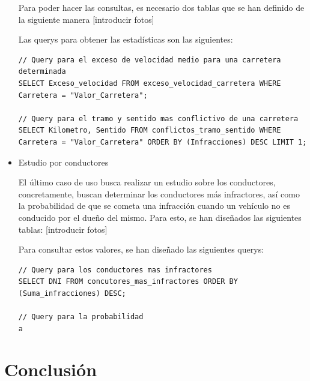 \documentclass[]{article}
\begin{document}
\begin{itemize}
    Para poder hacer las consultas, es necesario dos tablas que se han definido de la siguiente manera [introducir fotos]

    Las querys para obtener las estadísticas son las siguientes:

    \begin{lstlisting}[language=cql, caption=Querys para el caso de uso 2]
// Query para el exceso de velocidad medio para una carretera determinada
SELECT Exceso_velocidad FROM exceso_velocidad_carretera WHERE Carretera = "Valor_Carretera";

// Query para el tramo y sentido mas conflictivo de una carretera
SELECT Kilometro, Sentido FROM conflictos_tramo_sentido WHERE Carretera = "Valor_Carretera" ORDER BY (Infracciones) DESC LIMIT 1;
    \end{lstlisting}
 
    \item Estudio por conductores

    El último caso de uso busca realizar un estudio sobre los conductores, concretamente, buscan determinar los conductores más infractores, así como la probabilidad de que se cometa una infracción cuando un vehículo no es conducido por el dueño del mismo. Para esto, se han diseñados las siguientes tablas: [introducir fotos]

    Para consultar estos valores, se han diseñado las siguientes querys:

    \begin{lstlisting}[language=cql, caption=Querys para el caso de uso 3]
// Query para los conductores mas infractores
SELECT DNI FROM concutores_mas_infractores ORDER BY (Suma_infracciones) DESC;

// Query para la probabilidad
a

    \end{lstlisting}
\end{itemize}

\newpage
\section{Conclusión}
\label{sec:conclusion}
\end{document}
